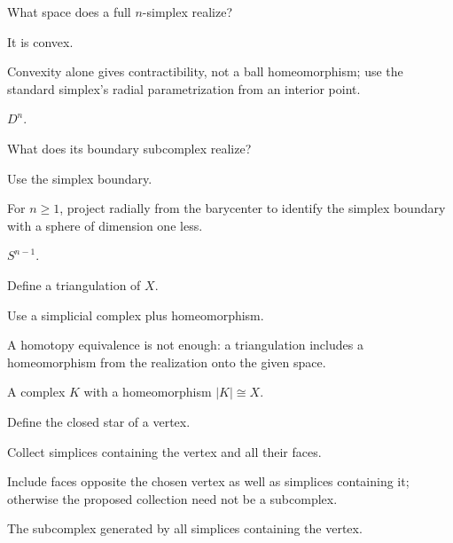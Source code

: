 \begin{exercise}\label{exr:viii15-09}
What space does a full \(n\)-simplex realize?
\end{exercise}
\begin{hint}
It is convex.

Convexity alone gives contractibility, not a ball homeomorphism; use the standard simplex's radial parametrization from an interior point.
\end{hint}
\begin{solution}
\(D^n\).
\end{solution}

\begin{exercise}\label{exr:viii15-10}
What does its boundary subcomplex realize?
\end{exercise}
\begin{hint}
Use the simplex boundary.

For \(n\ge1\), project radially from the barycenter to identify the simplex boundary with a sphere of dimension one less.
\end{hint}
\begin{solution}
\(S^{n-1}\).
\end{solution}

\begin{exercise}\label{exr:viii15-11}
Define a triangulation of \(X\).
\end{exercise}
\begin{hint}
Use a simplicial complex plus homeomorphism.

A homotopy equivalence is not enough: a triangulation includes a homeomorphism from the realization onto the given space.
\end{hint}
\begin{solution}
A complex \(K\) with a homeomorphism \(|K|\cong X\).
\end{solution}

\begin{exercise}\label{exr:viii15-12}
Define the closed star of a vertex.
\end{exercise}
\begin{hint}
Collect simplices containing the vertex and all their faces.

Include faces opposite the chosen vertex as well as simplices containing it; otherwise the proposed collection need not be a subcomplex.
\end{hint}
\begin{solution}
The subcomplex generated by all simplices containing the vertex.
\end{solution}

